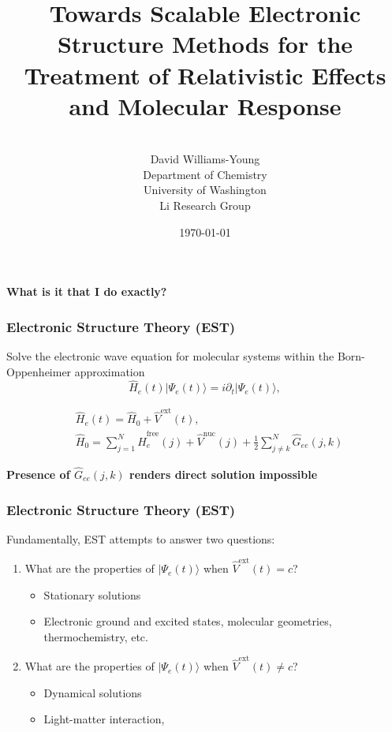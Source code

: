\documentclass[usepdftitle=false]{beamer}
\title[]{Towards Scalable Electronic Structure Methods for the Treatment
  of Relativistic Effects and Molecular Response}
\author[]{
\\[2\baselineskip]
David Williams-Young \\
Department of Chemistry\\
University of Washington\\
Li Research Group
}
\date{\today}
\newcommand{\op}[1]{\hat{#1}}
\newcommand{\ket}[1]{\vert #1 \rangle}         %
\begin{document}
\begin{frame}
  \titlepage
\end{frame}

\begin{frame}

  \begin{center} 
    \LARGE \bf What is it that I do exactly?
  \end{center}

\end{frame}

\begin{frame}

  \frametitle{Electronic Structure Theory (EST)}

  Solve the electronic wave equation for molecular systems within
  the Born-Oppenheimer approximation
  \begin{equation*}
    \op H_e(t) \ket{\Psi_e (t)} = i\partial_t \ket{\Psi_e (t)},
  \end{equation*}

  \begin{align*}
    &\op H_e(t) = \op H_0 + \op V^\mathrm{ext}(t),\\
    &\op H_0 = \sum_{j=1}^{N} 
        \op H_e^\mathrm{free}(j) + \op V^\mathrm{nuc}(j)  + 
	\frac{1}{2} \sum_{j \neq k}^N \op G_{ee}(j,k)
  \end{align*}

  \vspace{0.5cm}

  {\bf Presence of $\op G_{ee}(j,k)$ renders direct solution impossible}
  

\end{frame}

\begin{frame}

  \frametitle{Electronic Structure Theory (EST)}

  Fundamentally, EST attempts to answer two questions:

  \begin{enumerate}

    \item What are the properties of $\ket{\Psi_e(t)}$ when 
      $\op V^\mathrm{ext}(t) = c$?

    \begin{itemize}
      \item Stationary solutions
      \item Electronic ground and excited states, molecular geometries,
      thermochemistry, etc.
    \end{itemize}

    \item What are the properties of $\ket{\Psi_e(t)}$ when 
      $\op V^\mathrm{ext}(t) \neq c$?
    \begin{itemize}
      \item Dynamical solutions
      \item Light-matter interaction, 
    \end{itemize}

  \end{enumerate}

\end{frame}
\end{document}
